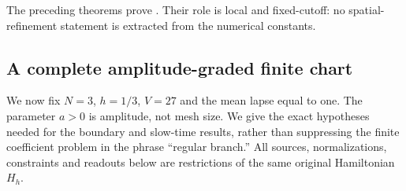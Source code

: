 \documentclass[11pt]{article}
\numberwithin{equation}{section}
\theoremstyle{definition}
\theoremstyle{remark}
\begin{document}
The preceding theorems prove .  Their
role is local and fixed-cutoff: no spatial-refinement statement is extracted
from the numerical constants.

\subsection{A complete amplitude-graded finite chart}
\label{subsec:supp-exact-chart}

We now fix $N=3$, $h=1/3$, $V=27$ and the mean lapse equal to one. The
parameter $a>0$ is amplitude, not mesh size. We give the exact hypotheses
needed for the boundary and slow-time results, rather than suppressing the
finite coefficient problem in the phrase ``regular branch.'' All sources,
normalizations, constraints and readouts below are restrictions of the same
original Hamiltonian $H_h$.
\end{document}
